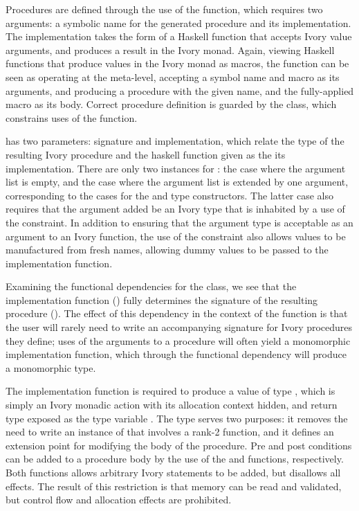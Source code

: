 Procedures are defined through the use of the  function, which requires
two arguments: a symbolic name for the generated procedure and its
implementation.  The implementation takes the form of a Haskell function that
accepts Ivory value arguments, and produces a result in the Ivory monad.  Again,
viewing Haskell functions that produce values in the Ivory monad as macros, the
 function can be seen as operating at the meta-level, accepting a
symbol name and macro as its arguments, and producing a procedure with the given
name, and the fully-applied macro as its body.  Correct procedure definition is
guarded by the  class, which constrains uses of the 
function. 

 has two parameters: signature and implementation, which relate
the  type of the resulting Ivory procedure and the haskell function
given as the its implementation.  There are only two instances for
: the case where the argument list is empty, and the case where
the argument list is extended by one argument, corresponding to the cases for
the  and  type constructors.  The latter case also requires
that the argument added be an Ivory type that is inhabited by a use of the
 constraint.  In addition to ensuring that the argument type is
acceptable as an argument to an Ivory function, the use of the 
constraint also allows values to be manufactured from fresh names, allowing
dummy values to be passed to the implementation function.

Examining the functional dependencies for the  class, we see
that the implementation function () fully determines the signature of
the resulting procedure ().  The effect of this dependency in the
context of the  function is that the user will rarely need to write an
accompanying  signature for Ivory procedures they define; uses of the
arguments to a procedure will often yield a monomorphic implementation function,
which through the functional dependency will produce a monomorphic 
type.

The implementation function is required to produce a value of type ,
which is simply an Ivory monadic action with its allocation context hidden, and
return type exposed as the type variable .  The  type serves two
purposes: it removes the need to write an instance of  that
involves a rank-2 function, and it defines an extension point for modifying the
body of the procedure.  Pre and post conditions can be added to a procedure body
by the use of the  and  functions, respectively.  Both
functions allows arbitrary Ivory statements to be added, but disallows all
effects.  The result of this restriction is that memory can be read and
validated, but control flow and allocation effects are prohibited.

